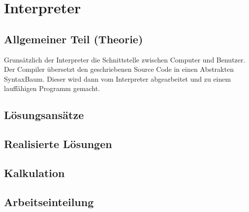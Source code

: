 

\chapter{Interpreter}


\section{Allgemeiner Teil (Theorie)}
Gruns\"atzlich der Interpreter die Schnittstelle zwischen Computer und Benutzer. Der Compiler übersetzt den geschriebenen
Source Code in einen Abstrakten SyntaxBaum. Dieser wird dann vom Interpreter abgearbeitet und zu einem lauffähigen Programm gemacht.


\section{Lösungsansätze}

\section{Realisierte Lösungen}

\section{Kalkulation}

\section{Arbeitseinteilung}